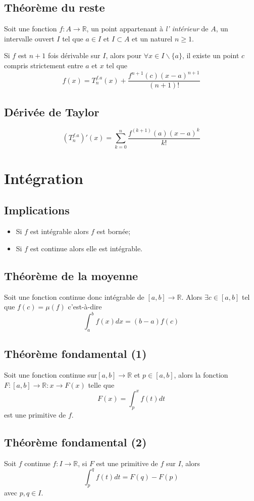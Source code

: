 \subsection{Théorème du reste}
Soit une fonction $f : A \rightarrow \mathbb{R}$,
un point appartenant à \emph{l' intérieur} de $A$,
un intervalle ouvert $I$ tel que $a \in I$ et $I\subset A$
et un naturel $n \geq 1$.

Si $f$ est $n + 1$ fois dérivable sur $I$,
alors pour $\forall x \in I \backslash \{a\}$,
il existe un point $c$ compris strictement entre $a$ et $x$ tel que
\[ f(x) = T_n^{f.a}(x) + \frac{f^{n+1}(c)(x - a)^{n+1}}{(n + 1)!} \]

\subsection{Dérivée de Taylor}
\[ \left(T_n^{f.a}\right)'(x) =
\sum_{k = 0}^n \frac{f^{(k+1)}(a)(x - a)^{k}}{k!} \]

\section{Intégration}
\subsection{Implications}
\begin{itemize}
  \item Si $f$ est intégrable alors $f$ est bornée;
  \item Si $f$ est continue alors elle est intégrable.
\end{itemize}

\subsection{Théorème de la moyenne}
Soit une fonction continue donc intégrable de $[a,b] \rightarrow \mathbb{R}$.
Alors $\exists c \in [a,b]$ tel que $f(c) = \mu{(f)}$ c'est-à-dire
\[ \int_a^b f(x) dx = (b - a)f(c) \]

\subsection{Théorème fondamental (1)}
Soit une fonction continue sur$[a,b] \rightarrow \mathbb{R}$ et $p \in [a,b]$,
alors la fonction $F : [a,b] \rightarrow \mathbb{R} : x \rightarrow F(x)$
telle que
\[ F(x) = \int_p^x f(t) dt \]
est une primitive de $f$.

\subsection{Théorème fondamental (2)}
Soit $f$ continue $f : I \rightarrow \mathbb{R}$,
si $F$ est une primitive de $f$ sur $I$, alors
\[ \int_p^q f(t) dt = F(q) - F(p) \]
avec $p, q \in I$.

